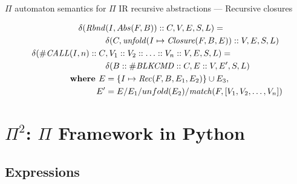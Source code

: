 \documentclass{beamer}
\begin{document}

\begin{frame}{{\color{red}$\Pi$ automaton} semantics for {\color{red}$\Pi$ IR} recursive abstractions --- Recursive closures}

\begin{small}
\begin{align}
\delta(\mathit{Rbnd}&(I, Abs(F, B)) :: C, V, E, S, L)  = \nonumber \\ & \delta(C, \mathit{unfold}(I \mapsto \mathit{Closure}(F, B, E)) :: V, E, S, L) \\
\delta(\#\mathit{CALL}(I, n) ::C & , V_1 :: V_2 :: \ldots :: V_n :: V, E, S, L) = \nonumber \\
	& \delta(B :: \#\mathit{BLKCMD} :: C, E :: V, E', S, L) \\
\text{\bf where } E & =  \{I \mapsto \mathit{Rec}(F, B, E_1, E_2)\} \cup E_3, \nonumber \\
E'  & = E / E_1 / unfold(E_2) / \mathit{match}(F,  [V_1, V_2, \ldots, V_n]) \nonumber
\end{align}
\end{small}

\end{frame}

\section{$\Pi^2$: $\Pi$ Framework in Python}

\subsection{Expressions}
\end{document}
